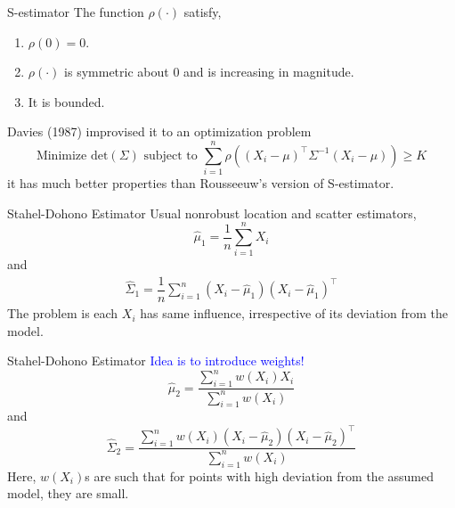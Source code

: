 \documentclass[10pt,xcolor=svgnames]{beamer} %
\newcommand{\tr}{^{\intercal}}
\begin{document}
\begin{frame}{S-estimator}
    The function $\rho(\cdot)$ satisfy,
    \begin{enumerate}
        \item $\rho(0) = 0$.
        \item $\rho(\cdot)$ is symmetric about $0$ and is increasing in magnitude.
        \item It is bounded.
    \end{enumerate}
    Davies (1987) improvised it to an optimization problem
    \begin{equation*}
        \text{Minimize } \text{det}(\Sigma) \text{ subject to } \sum_{i=1}^n  \rho\left( (X_i - \mu)\tr \Sigma^{-1} (X_i - \mu ) \right) \geq K
    \end{equation*}
    it has much better properties than Rousseeuw's version of S-estimator.
\end{frame}

\begin{frame}{Stahel-Dohono Estimator}
    Usual nonrobust location and scatter estimators,\\
    \begin{equation*}
        \widehat{\mu}_1 = \dfrac{1}{n}\sum_{i=1}^n X_i
    \end{equation*}
    \noindent and \\
    \begin{align*}
        \widehat{\Sigma}_1 = \dfrac{1}{n}\sum_{i=1}^n (X_i - \widehat{\mu}_1)(X_i - \widehat{\mu}_1)\tr 
    \end{align*}
    The problem is each $X_i$ has same influence, irrespective of its deviation from the model.
\end{frame}


\begin{frame}{Stahel-Dohono Estimator}
    \textcolor{blue}{Idea is to introduce weights!}\\
    \begin{equation*}
        \widehat{\mu}_2 = \dfrac{\sum_{i=1}^n w(X_i) X_i}{\sum_{i=1}^n w(X_i)}
    \end{equation*}
    \noindent and\\
    \begin{equation*}
        \widehat{\Sigma}_2 = \dfrac{\sum_{i=1}^n w(X_i) (X_i - \widehat{\mu}_2)(X_i - \widehat{\mu}_2)\tr}{\sum_{i=1}^n w(X_i)}
    \end{equation*}
    Here, $w(X_i)$s are such that for points with high deviation from the assumed model, they are small.
\end{frame}
\end{document}
